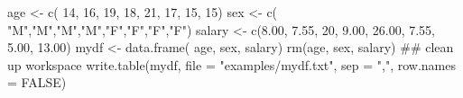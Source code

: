 \begin{Schunk}
\begin{Sinput}
 age <- c( 14, 16, 19, 18, 21, 17, 15, 15)
 sex <- c( "M","M","M","M","F","F","F","F")
 salary <- c(8.00, 7.55, 20, 9.00, 26.00, 7.55, 5.00, 13.00)
 mydf <- data.frame( age, sex, salary)
 rm(age, sex, salary) ## clean up workspace
 write.table(mydf, file = "examples/mydf.txt", sep = ",", row.names = FALSE)
\end{Sinput}
\end{Schunk}
